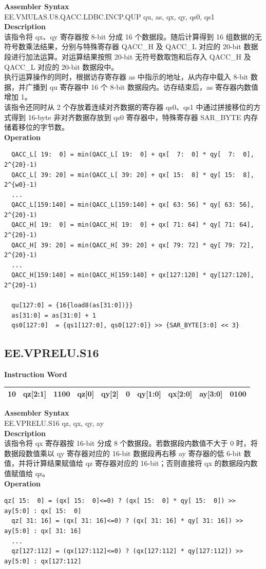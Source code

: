 \textbf{Assembler Syntax} \\
EE.VMULAS.U8.QACC.LDBC.INCP.QUP qu, as, qx, qy, qs0, qs1 \\
\textbf{Description} \\
该指令将 qx、qy 寄存器按 8-bit 分成 16 个数据段。随后计算得到 16 组数据的无符号数乘法结果，分别与特殊寄存器 QACC\_H 及 QACC\_L 对应的 20-bit 数据段进行加法运算。对运算结果按照 20-bit 无符号数取饱和后存入 QACC\_H 及 QACC\_L 对应的 20-bit 数据段中。\\
执行运算操作的同时，根据访存寄存器 as 中指示的地址，从内存中载入 8-bit 数据，并广播到 qu 寄存器中 16 个 8-bit 数据段内。访存结束后，as 寄存器内数值增加 1。\\
该指令还同时从 2 个存放着连续对齐数据的寄存器 qs0、qs1 中通过拼接移位的方式得到 16-byte 非对齐数据存放到 qs0 寄存器中，特殊寄存器 SAR\_BYTE 内存储着移位的字节数。\\
\textbf{Operation}
\begin{lstlisting}
  QACC_L[ 19:  0] = min(QACC_L[ 19:  0] + qx[  7:  0] * qy[  7:  0], 2^{20}-1)
  QACC_L[ 39: 20] = min(QACC_L[ 39: 20] + qx[ 15:  8] * qy[ 15:  8], 2^{w0}-1)
  ...
  QACC_L[159:140] = min(QACC_L[159:140] + qx[ 63: 56] * qy[ 63: 56], 2^{20}-1)
  QACC_H[ 19:  0] = min(QACC_H[ 19:  0] + qx[ 71: 64] * qy[ 71: 64], 2^{20}-1)
  QACC_H[ 39: 20] = min(QACC_H[ 39: 20] + qx[ 79: 72] * qy[ 79: 72], 2^{20}-1)
  ...
  QACC_H[159:140] = min(QACC_H[159:140] + qx[127:120] * qy[127:120], 2^{20}-1)

  qu[127:0] = {16{load8(as[31:0])}}
  as[31:0] = as[31:0] + 1
  qs0[127:0]  = {qs1[127:0], qs0[127:0]} >> {SAR_BYTE[3:0] << 3}
\end{lstlisting}

\clearpage
\subsection{EE.VPRELU.S16}\label{instruction:EEVPRELUS16}
\setlength\tabcolsep{6pt}
\textbf{Instruction Word} \\
\begin{tabular}{|c|c|c|c|c|c|c|c|c|c|}
	\hline
	10 & qz[2:1] & 1100 & qz[0] & qy[2] & 0 & qy[1:0] & qx[2:0] & ay[3:0] & 0100 \\
	\hline
\end{tabular}

\textbf{Assembler Syntax} \\
EE.VPRELU.S16 qz, qx, qy, ay \\
\textbf{Description} \\
该指令将 qx 寄存器按 16-bit 分成 8 个数据段。若数据段内数值不大于 0 时，将数据段数值乘以 qy 寄存器对应的 16-bit 数据段再右移 ay 寄存器的低 6-bit 数值，并将计算结果赋值给 qz 寄存器对应的 16-bit；否则直接将 qx 的数据段内数值赋值给 qz。\\
\textbf{Operation}
\begin{lstlisting}[escapeinside=`?]
  qz[ 15:  0] = (qx[ 15:  0]<=0) ? (qx[ 15:  0] * qy[ 15:  0]) >> ay[5:0] : qx[ 15:  0]
  qz[ 31: 16] = (qx[ 31: 16]<=0) ? (qx[ 31: 16] * qy[ 31: 16]) >> ay[5:0] : qx[ 31: 16]
  ...
  qz[127:112] = (qx[127:112]<=0) ? (qx[127:112] * qy[127:112]) >> ay[5:0] : qx[127:112]
\end{lstlisting}

